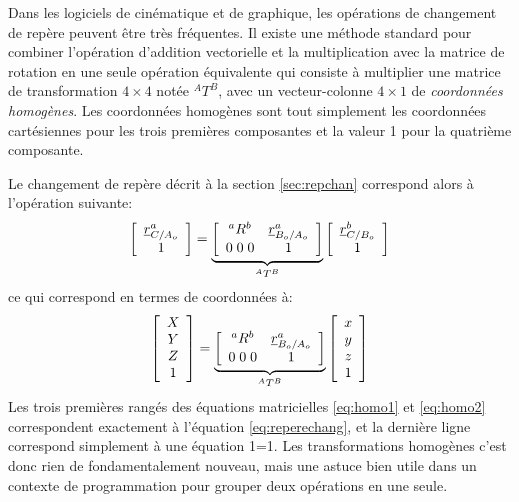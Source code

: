 Dans les logiciels de cinématique et de graphique, les opérations de changement de repère peuvent être très fréquentes. Il existe une méthode standard pour combiner l'opération d'addition vectorielle et la multiplication avec la matrice de rotation en une seule opération équivalente qui consiste à multiplier une matrice de transformation $4\times4$ notée $^AT^B$, avec un vecteur-colonne $4\times1$ de \textit{coordonnées homogènes}. Les coordonnées homogènes sont tout simplement les coordonnées cartésiennes pour les trois premières composantes et la valeur 1 pour la quatrième composante. 

Le changement de repère décrit à la section \ref{sec:repchan} correspond alors à l'opération suivante:
\begin{align}
\left[ \begin{array}{c} 
\underline{r}_{C/A_o}^a \\ 1
\end{array} \right] 
= 
\underbrace{
\left[ \begin{array}{c c } 
^aR^b & \underline{r}_{B_o/A_o}^a \\ 0 \; 0 \; 0 & 1
\end{array} \right] 
}_{^AT^B}
\left[ \begin{array}{c} 
\underline{r}_{C/B_o}^b \\ 1
\end{array} \right] 
\label{eq:homo1}
\end{align} 
ce qui correspond en termes de coordonnées à:
\begin{align}
\left[ \begin{array}{c} 
X \\ Y \\ Z \\ 1
\end{array} \right] 
= 
\underbrace{
\left[ \begin{array}{c c } 
^aR^b & \underline{r}_{B_o/A_o}^a \\ 0 \; 0 \; 0 & 1
\end{array} \right] 
}_{^AT^B}
\left[ \begin{array}{c} 
x \\ y \\ z \\ 1
\end{array} \right] 
\label{eq:homo2}
\end{align} 
Les trois premières rangés des équations matricielles \eqref{eq:homo1} et \eqref{eq:homo2} correspondent exactement à l'équation \eqref{eq:reperechang}, et la dernière ligne correspond simplement à une équation 1=1. Les transformations homogènes c'est donc rien de fondamentalement nouveau, mais une astuce bien utile dans un contexte de programmation pour grouper deux opérations en une seule. %

